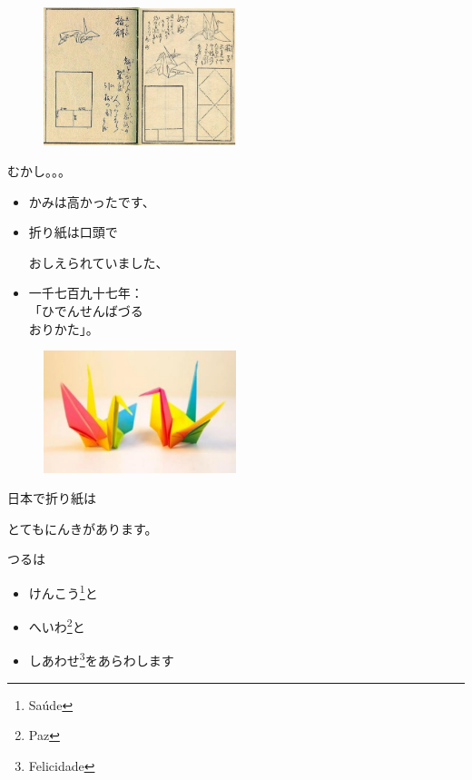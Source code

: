 \documentclass{beamer}
\begin{document}
\begin{frame}
	\begin{figure}
			\includegraphics[width=0.5\textwidth]{aa.png}
	\end{figure}
	むかし。。。
	\begin{itemize}
		\item かみは高かったです、
		\item 折り紙は口頭で
		
		おしえられていました、
		\item 一千七百九十七年：\\「ひでんせんばづる\\おりかた」。
	\end{itemize}
\end{frame}
\begin{frame}
	\begin{figure}
			\includegraphics[width=0.5\textwidth]{aaa.png}
	\end{figure}
    日本で折り紙は
    
    とてもにんきがあります。
    
    つるは
    \begin{itemize}
    	\item けんこう\footnote{Saúde}と
    	\item へいわ\footnote{Paz}と
    	\item しあわせ\footnote{Felicidade}をあらわします
    \end{itemize}
    
    
     
\end{frame}
\end{document}
